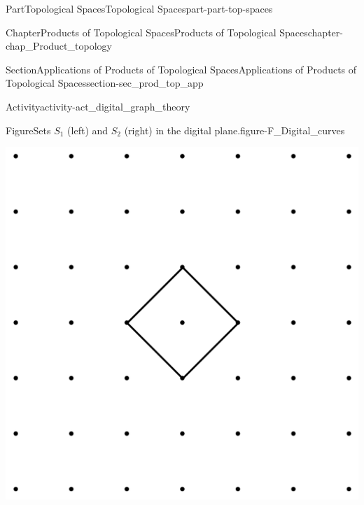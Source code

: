 \documentclass[oneside,10pt,]{book}
\numberwithin{equation}{chapter}
\begin{document}
\begin{partptx}{Part}{Topological Spaces}{}{Topological Spaces}{}{}{part-part-top-spaces}
\begin{chapterptx}{Chapter}{Products of Topological Spaces}{}{Products of Topological Spaces}{}{}{chapter-chap_Product_topology}
\begin{sectionptx}{Section}{Applications of Products of Topological Spaces}{}{Applications of Products of Topological Spaces}{}{}{section-sec_prod_top_app}
\begin{activity}{Activity}{}{activity-act_digital_graph_theory}
\begin{enumerate}[font=\bfseries,label=(\alph*),ref=\alph*]
\begin{figureptx}{Figure}{Sets \(S_1\) (left) and \(S_2\) (right) in the digital plane.}{figure-F_Digital_curves}{}
\begin{sidebyside}{2}{0.025}{0.025}{0.05}
\begin{sbspanel}{0.45}
\includegraphics[width=\linewidth]{external/digital_curve_1.pdf}
\end{sbspanel}%
\begin{sbspanel}{0.45}%

\end{sbspanel}
\end{sidebyside}
\end{figureptx}
\end{enumerate}
\end{activity}
\end{sectionptx}
\end{chapterptx}
\end{partptx}
\end{document}
